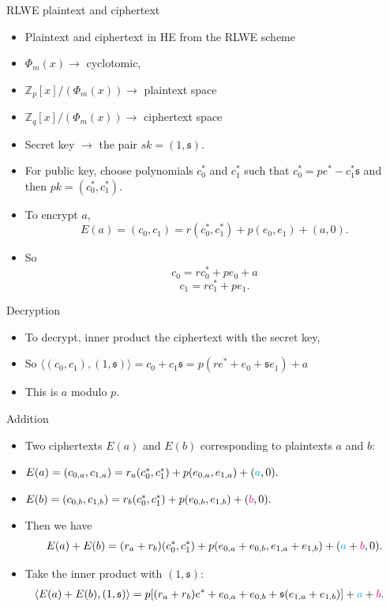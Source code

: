 \documentclass[ %
usenames,dvipsnames,
aspectratio=169,11pt]{beamer}
\newenvironment{stepitemize}{\begin{itemize}[<+->]}{\end{itemize} }
\newcommand{\Z}{\mathbb{Z}}
\begin{document}
\begin{frame}{RLWE plaintext and ciphertext}
\begin{stepitemize}
\item Plaintext and ciphertext in HE from the RLWE scheme
\item $\Phi_m(x)\rightarrow $ cyclotomic,
\item $\Z_p[x]/(\Phi_m(x))\rightarrow$ plaintext space
\item $\Z_q[x]/(\Phi_m(x))\rightarrow $ ciphertext space
\item Secret key $\rightarrow$ the pair $sk=(1, \mathfrak{s})$.
\item For public key, choose polynomials $c_0^*$ and $c_1^*$ such that
$c_0^*=pe^*-c_1^*\mathfrak{s}$ and then $pk=(c_0^*, c_1^*)$.
\item To encrypt $a$,
$$E(a) = (c_0,c_1) = r(c_0^*,c_1^*)+p(e_0,e_1)+(a,0).$$
\item So
$$c_0 = rc_0^*+pe_0+a$$
$$c_1 = rc_1^*+pe_1.$$
\end{stepitemize}
\end{frame}

\begin{frame}{Decryption}
    \begin{stepitemize}
    \item To decrypt, inner product the ciphertext with the secret key,
    \item So $\langle (c_0,c_1),(1, \mathfrak{s})\rangle = c_0+c_1\mathfrak{s} = p(re^*+e_0+\mathfrak{s}e_1)+a$
    \item This is $a$ modulo $p$.
    \end{stepitemize}
\end{frame}

\begin{frame}{Addition}
    \begin{stepitemize}
    \item Two ciphertexts $E(a)$ and $E(b)$ corresponding to plaintexts $a$ and $b$:
    \item $E(a) = (c_{0,a},c_{1,a}) = r_a(c_0^*,c_1^*)+p(e_{0,a},e_{1,a})+({\color{cyan}a},0).$
    \item $E(b) = (c_{0,b},c_{1,b}) = r_b(c_0^*,c_1^*)+p(e_{0,b},e_{1,b})+({\color{magenta}b},0).$
    \item Then we have
    $$E(a)+E(b) = (r_a+r_b)(c_0^*, c_1^*)+p(e_{0,a}+e_{0,b}, e_{1,a}+e_{1,b})+({\color{cyan}a}+{\color{magenta}b},0).$$
    \item Take the inner product with $(1,\mathfrak{s})$:
    \begin{align*}
        \langle E(a)+E(b), (1, \mathfrak{s})\rangle &= p[(r_a+r_b)e^*+e_{0,a}+e_{0,b}+\mathfrak{s}(e_{1,a}+e_{1,b})]+{\color{cyan}a}+{\color{magenta}b}.
    \end{align*}

    \end{stepitemize}
\end{frame}
\end{document}
